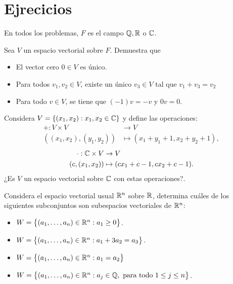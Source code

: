 \documentclass[12pt,a4paper]{book}
\newcommand{\llaves}[1]{\{#1\}}
\newcommand{\parentesis}[1]{\left(#1\right)}
\newcommand{\llavesgrande}[1]{\big\{#1\big\}}
\begin{document}
    \section{Ejrecicios}

    En todos los problemas, $F$ es el campo $\mathbb{Q}, \mathbb{R}$ o $\mathbb{C}$.

    \begin{ejercicio}
        Sea $V$ un espacio vectorial sobre $F$. Demuestra que
        \begin{itemize}
            \item[(a)] El vector cero $0 \in V$ es único.
            \item[(b)] Para todos $v_1, v_2 \in V$, existe un único $v_3 \in V$ tal que $v_1 + v_3 = v_2$
            \item[(c)] Para todo $v \in V$, se tiene que $(-1)v = -v$ y $0v = 0$.
        \end{itemize}
    \end{ejercicio}

    \begin{ejercicio}
        Considera $V = \llaves{(x_1,x_2) : x_1,x_2 \in \C}$ y define las operaciones:
        \begin{align*}
            + : V \times V & \to V\\
            \parentesis{(x_1,x_2), (y_1, y_2)} & \mapsto (x_1 + y_1 + 1, x_2 + y_2 + 1),
        \end{align*}
        \begin{align*}
            \cdot : \mathbb{C} \times V & \to V\\
            (c,(x_1, x_2)) & \mapsto (cx_1 + c - 1, cx_2 + c - 1).
        \end{align*}
        ¿Es $V$ un espacio vectorial sobre $\mathbb{C}$ con estas operaciones?.
    \end{ejercicio}

    \begin{ejercicio}
        Considera el espacio vectorial usual $\mathbb{R}^n$ sobre $\mathbb{R}$, determina cuáles de los siguientes subconjuntos son subespacios vectoriales de $\mathbb{R}^n$:
        \begin{itemize}
            \item[(a)] $W = \llavesgrande{(a_1, \dots , a_n) \in \R^n: a_1 \geq 0}$.
            \item[(b)] $W = \llavesgrande{(a_1, \dots , a_n) \in \R^n:a_1 + 3a_2 = a_3}$.
            \item[(c)] $W = \llavesgrande{(a_1, \dots , a_n) \in \R^n:a_1 = a_2}$
            \item[(d)] $W = \llavesgrande{(a_1, \dots , a_n) \in \R^n: a_j \in \Q, \text{ para todo }1 \leq j \leq n}$.
        \end{itemize}
    \end{ejercicio}
\end{document}
